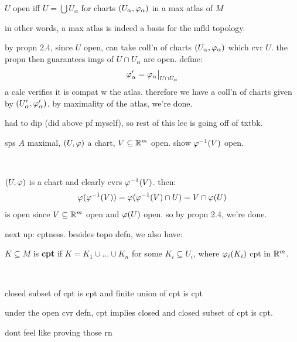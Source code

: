 \begin{lm}[type=Remark]
    $U$ open iff $U=\bigcup U_{\alpha}$ for charts
	$(U_{\alpha},\varphi_{\alpha})$ in a max atlas of $M$
\end{lm}
in other words, a max atlas is indeed a basis for the mfld topology.

\newpage
\begin{pf}
	by propn 2.4, since $U$ open, can take coll'n of charts $(U_{\alpha},\varphi_{\alpha})$
	which cvr $U$.
	the propn then guarantees imgs of $U\cap U_{\alpha}$ are open.
	define:
	\begin{equation*}
		\varphi_{\alpha}'=\varphi_{\alpha}\big\rvert_{U\cap U_{\alpha}}
	\end{equation*}
	a calc verifies it is compat w the atlas.
	therefore we have a coll'n of charts given by
	$(U_{\alpha}',\varphi_{\alpha}')$.
	by maximality of the atlas, we're done.
\end{pf}
had to dip (did above pf myself), so rest of this lec is going off of txtbk.

\begin{exr}[source=textbook]
    sps $A$ maximal, $(U,\varphi)$ a chart, $V\subseteq\mathbb{R}^{m}$ open.
	show $\varphi^{-1}(V)$ open.
\end{exr} \

\begin{pf}
    $(U,\varphi)$ is a chart and clearly cvrs $\varphi^{-1}(V)$. then:
	\begin{equation*}
	    \varphi(\varphi^{-1}(V))=\varphi(\varphi^{-1}(V)\cap U)=V\cap\varphi(U)
	\end{equation*}
	is open since $V\subseteq\mathbb{R}^{m}$ open and $\varphi(U)$ open.
	so by propn 2.4, we're done.
\end{pf}

next up: cptness.
besides topo defn, we also have:

\begin{defn}
    $K\subseteq M$ is \textbf{cpt} if $K=K_{1}\cup \dots \cup K_{n}$
	for some $K_{i}\subseteq U_{i}$, where $\varphi_{i}(K_{i})$ cpt in $\mathbb{R}^{m}$.
\end{defn} \

\begin{lm}
	closed subset of cpt is cpt and finite union of cpt is cpt
\end{lm}

\begin{lm}
    under the open cvr defn, cpt implies closed and closed subset of cpt is cpt.
\end{lm}
dont feel like proving those rn

